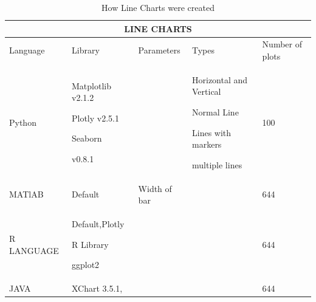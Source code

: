 \documentclass[12pt, a4paper,oneside]{report}
\begin{document}
\begin{table}[h]
	\centering {} \small
	
	\begin{tabular}{|p{3cm}|p{3cm}|p{3cm}|p{3cm}|p{3cm}|}
		
		\hline
		\multicolumn{5}{|c|}{LINE CHARTS} \\
		\hline
		
		Language & Library & Parameters &  Types & Number of plots\\ \hline
		
		Python  & Matplotlib v2.1.2 \par Plotly v2.5.1 \par Seaborn
		
		v0.8.1 &   &
		
		Horizontal and Vertical \par Normal Line \par Lines with markers \par multiple lines  & 100\\ \hline
		
		MATlAB   & Default &  Width of bar &  &  644\\ \hline
		
		
		R LANGUAGE   & Default,Plotly \par R Library \par ggplot2 &  &  &  644\\ \hline
		
		JAVA   & XChart 3.5.1, &   &  &  644\\ \hline
		
	\end{tabular}
	
	\caption {How Line Charts were created}	\label{Table:1}
\end{table}
\end{document}
